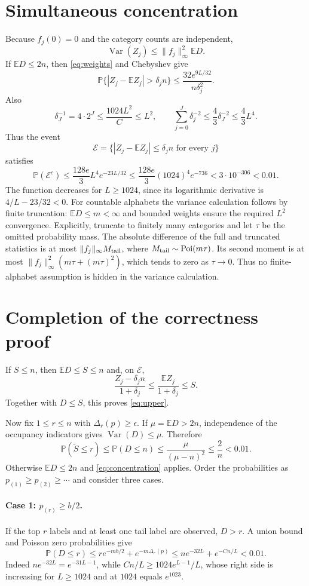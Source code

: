 \documentclass[11pt]{article}
\newcommand{\E}{\mathbb E}
\newcommand{\Prb}{\mathbb P}
\newcommand{\Var}{\operatorname{Var}}
\newcommand{\Poi}{\operatorname{Poi}}
\begin{document}
\section{Simultaneous concentration}
Because $f_j(0)=0$ and the category counts are independent,
\[
 \Var(Z_j)\le\|f_j\|_\infty^2\E D.
\]
If $\E D\le2n$, then \eqref{eq:weights} and Chebyshev give
\[
 \Prb\{|Z_j-\E Z_j|>\delta_jn\}
 \le\frac{32e^{9L/32}}{n\delta_j^2}.
\]
Also
\[
 \delta_J^{-1}=4\cdot2^J\le\frac{1024L^2}{C}\le L^2,
 \qquad \sum_{j=0}^J\delta_j^{-2}\le\frac43\delta_J^{-2}\le\frac43L^4.
\]
Thus the event
\[
 \mathcal E=\{|Z_j-\E Z_j|\le\delta_jn\text{ for every }j\}
\]
satisfies
\begin{equation}
 \Prb(\mathcal E^c)
 \le\frac{128e}{3}L^4e^{-23L/32}
 \le\frac{128e}{3}(1024)^4e^{-736}
 <3\cdot10^{-306}<0.01.\label{eq:concentration}
\end{equation}
The function decreases for $L\ge1024$, since its logarithmic derivative
is $4/L-23/32<0$. For countable alphabets the variance calculation follows
by finite truncation: $\E D\le m<\infty$ and bounded weights ensure the
required $L^2$ convergence. Explicitly, truncate to finitely many categories
and let $\tau$ be the omitted probability mass. The absolute difference of
the full and truncated statistics is at most $\|f_j\|_\infty M_{\rm tail}$,
where $M_{\rm tail}\sim\Poi(m\tau)$. Its second moment is at most
$\|f_j\|_\infty^2(m\tau+(m\tau)^2)$, which tends to zero as $\tau\to0$.
Thus no finite-alphabet assumption is hidden in the variance calculation.

\section{Completion of the correctness proof}
If $S\le n$, then $\E D\le S\le n$ and, on $\mathcal E$,
\[
 \frac{Z_j-\delta_jn}{1+\delta_j}
 \le\frac{\E Z_j}{1+\delta_j}\le S.
\]
Together with $D\le S$, this proves \eqref{eq:upper}.

Now fix $1\le r\le n$ with $\Delta_r(p)\ge\epsilon$.
If $\mu=\E D>2n$, independence of the occupancy indicators gives
$\Var(D)\le\mu$. Therefore
\[
 \Prb(\widetilde S\le r)\le\Prb(D\le n)
 \le\frac{\mu}{(\mu-n)^2}\le\frac2n<0.01.
\]
Otherwise $\E D\le2n$ and \eqref{eq:concentration} applies. Order the
probabilities as $p_{(1)}\ge p_{(2)}\ge\cdots$ and consider three cases.

\paragraph{Case 1: $p_{(r)}\ge b/2$.}
If the top $r$ labels and at least one tail label are observed, $D>r$.
A union bound and Poisson zero probabilities give
\[
 \Prb(D\le r)\le r e^{-mb/2}+e^{-m\Delta_r(p)}
 \le ne^{-32L}+e^{-Cn/L}<0.01.
\]
Indeed $ne^{-32L}=e^{-31L-1}$, while $Cn/L\ge1024e^{L-1}/L$,
whose right side is increasing for $L\ge1024$ and at $1024$ equals $e^{1023}$.
\end{document}
